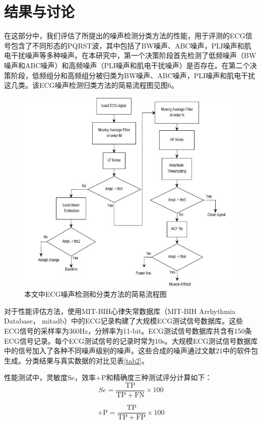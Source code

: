 \section{结果与讨论}

在这部分中，我们评估了所提出的噪声检测分类方法的性能，用于评测的ECG信号包含了不同形态的PQRST波，其中包括了BW噪声、ABC噪声，PLI噪声和肌电干扰噪声等多种噪声。在本研究中，第一个决策阶段首先检测了低频噪声（BW噪声和ABC噪声）和高频噪声（PLI噪声和肌电干扰噪声）是否存在。在第二个决策阶段，低频组分和高频组分被归类为BW噪声、ABC噪声，PLI噪声和肌电干扰这几类。该ECG噪声检测归类方法的简易流程图见图6。
\begin{figure}[htbp]
\label{figNo.6}
\centering
\includegraphics[width=0.7\columnwidth]{fig6.jpg}
\caption{本文中ECG噪声检测和分类方法的简易流程图
}
\end{figure}

对于性能评估方法，使用MIT-BIH心律失常数据库（MIT-BIH Arrhythmia Database， mitadb）中的ECG记录构建了大规模ECG测试信号数据库。这些ECG信号的采样率为360Hz，分辨率为11-bit。ECG测试信号数据库共含有150条ECG信号记录。每个ECG测试信号的记录时常为10s。大规模ECG测试信号数据库中的信号加入了各种不同噪声级别的噪声。这些合成的噪声通过文献21中的软件包生成。分类结果与真实数据的对比见表\ref{tab2}。

性能测试中，灵敏度Se，效率+P和精确度三种测试评分计算如下：
\begin{equation}
  Se=\frac{\mathrm{TP}}{\mathrm{TP+FN}} \times 100
  \label{equ9}
\end{equation}

\begin{equation}
  \mathrm{+P}=\frac{\mathrm{TP}}{\mathrm{TP+FP}} \times 100
  \label{equ10}
\end{equation}

